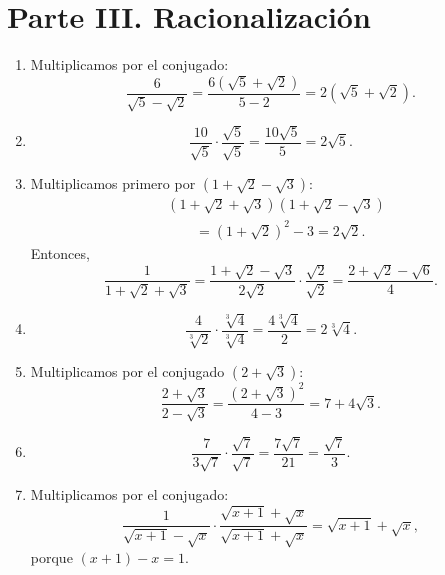 \documentclass[12pt,a4paper]{article}
\begin{document}
\section*{Parte III. Racionalización}
\begin{enumerate}
  \item Multiplicamos por el conjugado:
    \[
      \frac{6}{\sqrt{5}-\sqrt{2}}
      =\frac{6(\sqrt{5}+\sqrt{2})}{5-2}
      =\boxed{2(\sqrt{5}+\sqrt{2})}.
    \]

  \item
    \[
      \frac{10}{\sqrt{5}}\cdot\frac{\sqrt{5}}{\sqrt{5}}
      =\frac{10\sqrt{5}}{5}=\boxed{2\sqrt{5}}.
    \]

  \item Multiplicamos primero por $(1+\sqrt{2}-\sqrt{3})$:
    \begin{align*}
      &(1+\sqrt{2}+\sqrt{3})(1+\sqrt{2}-\sqrt{3})\\
      &\qquad=(1+\sqrt{2})^2-3=2\sqrt{2}.
    \end{align*}
    Entonces,
    \[
      \frac{1}{1+\sqrt{2}+\sqrt{3}}
      =\frac{1+\sqrt{2}-\sqrt{3}}{2\sqrt{2}}
      \cdot\frac{\sqrt{2}}{\sqrt{2}}
      =\boxed{\frac{2+\sqrt{2}-\sqrt{6}}{4}}.
    \]

  \item
    \[
      \frac{4}{\sqrt[3]{2}}
      \cdot\frac{\sqrt[3]{4}}{\sqrt[3]{4}}
      =\frac{4\sqrt[3]{4}}{2}
      =\boxed{2\sqrt[3]{4}}.
    \]

  \item Multiplicamos por el conjugado $(2+\sqrt{3})$:
    \[
      \frac{2+\sqrt{3}}{2-\sqrt{3}}
      =\frac{(2+\sqrt{3})^2}{4-3}
      =\boxed{7+4\sqrt{3}}.
    \]

  \item
    \[
      \frac{7}{3\sqrt{7}}\cdot\frac{\sqrt{7}}{\sqrt{7}}
      =\frac{7\sqrt{7}}{21}
      =\boxed{\frac{\sqrt{7}}{3}}.
    \]

  \item Multiplicamos por el conjugado:
    \[
      \frac{1}{\sqrt{x+1}-\sqrt{x}}
      \cdot\frac{\sqrt{x+1}+\sqrt{x}}{\sqrt{x+1}+\sqrt{x}}
      =\boxed{\sqrt{x+1}+\sqrt{x}},
    \]
    porque $(x+1)-x=1$.
\end{enumerate}
\end{document}
